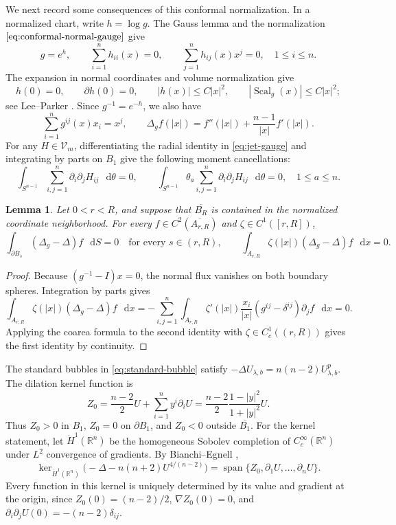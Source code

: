 \documentclass[11pt]{article}
\numberwithin{equation}{section}
\newtheorem{lemma}[theorem]{Lemma}
\theoremstyle{remark}
\newcommand{\R}{\mathbb R}
\newcommand{\Sph}{S}
\newcommand{\pa}{\partial}
\newcommand{\dd}{\mathop{}\!\mathrm{d}}
\begin{document}
{We next record some consequences of this conformal normalization.}
In a normalized chart, write \(h=\log g\). The Gauss lemma and the normalization \(\eqref{eq:conformal-normal-gauge}\) give
\begin{equation}\label{eq:normal-gauge}
 g=e^h,\qquad 
 \sum_{i=1}^nh_{ii}(x)=0,\qquad
 \sum_{j=1}^nh_{ij}(x)x^j=0, \quad 1\le i\le n.
\end{equation}
The expansion in normal coordinates and volume normalization give
\begin{equation}\label{eq:normal-orders}
 h(0)=0,\qquad \partial h(0)=0,\qquad
 |h(x)|\le C|x|^2,\qquad |\operatorname{Scal}_g(x)|\le C|x|^2;
\end{equation}
see Lee--Parker \cite[Theorem  5.1]{LeeParker}. Since \(g^{-1}=e^{-h}\),
we also have
\[
 \sum_{i=1}^ng^{ij}(x)x_i=x^j,\qquad
 \Delta_g f(|x|)=f''(|x|)+\frac{n-1}{|x|}f'(|x|).
\]
For any $H\in \mathcal V_m$, differentiating the radial
identity in \eqref{eq:jet-gauge} and integrating by parts on \(B_1\) give
the following moment cancellations:
{
\[
 \int_{\Sph^{n-1}}\sum_{i,j=1}^n\partial_i\partial_jH_{ij}\,\dd\theta=0,
 \qquad
 \int_{\Sph^{n-1}}\theta_a
       \sum_{i,j=1}^n\partial_i\partial_jH_{ij}\,\dd\theta=0,
 \quad 1\le a\le n.
\]
}

\begin{lemma}\label{lem:radial-cancellation}
Let \(0<r<R\), and suppose that \(\overline{B_R}\) is contained in the
normalized coordinate neighborhood. For every
\(f\in C^2(\overline{A_{r,R}})\) and \(\zeta\in C^1([r,R])\),
\[
 \int_{\pa B_s}(\Delta_g-\Delta)f\,\dd S=0
 \quad\text{for every }s\in(r,R),\qquad
 \int_{A_{r,R}}\zeta(|x|)(\Delta_g-\Delta)f\,\dd x=0.
\]
\end{lemma}
\begin{proof}
Because \((g^{-1}-I)x=0\), the normal flux vanishes on both boundary
spheres. Integration by parts gives
\[
 \int_{A_{r,R}}\zeta(|x|)(\Delta_g-\Delta)f\,\dd x
 =-\sum_{i,j=1}^n\int_{A_{r,R}}
 \zeta'(|x|)\frac{x_i}{|x|}(g^{ij}-\delta^{ij})\partial_jf\,\dd x=0.
\]
Applying the coarea formula to the second identity with
\(\zeta\in C_c^1((r,R))\) gives the first identity by continuity.
\end{proof}




The standard bubbles in \eqref{eq:standard-bubble} satisfy
\(-\Delta U_{\lambda,b}=n(n-2)U_{\lambda,b}^p\).
The dilation kernel function is
{
\[
 Z_0=\frac{n-2}{2}U+\sum_{i=1}^ny^i\partial_iU
 =\frac{n-2}{2}\frac{1-|y|^2}{1+|y|^2}U.
\]
}
Thus \(Z_0>0\) in \(B_1\), \(Z_0=0\) on \(\partial B_1\), and
\(Z_0<0\) outside \(\overline{B_1}\).
For the kernel statement,  let \(\dot H^1(\mathbb R^n)\) be the homogeneous Sobolev completion of \(C_c^\infty(\mathbb R^n)\) under \(L^2\) convergence of gradients.
By Bianchi--Egnell \cite[Lemma  A1]{BianchiEgnell},
{
\[
 \ker_{\dot H^1(\R^n)}
 \bigl(-\Delta-n(n+2)U^{4/(n-2)}\bigr)
 =\operatorname{span}\{Z_0,\partial_1U,\ldots,\partial_nU\}.
\]
}
Every function in this kernel is uniquely determined by its value and
gradient at the origin, since \(Z_0(0)=(n-2)/2\),
\(\nabla Z_0(0)=0\), and
\(\partial_i\partial_jU(0)=-(n-2)\delta_{ij}\).
\end{document}
